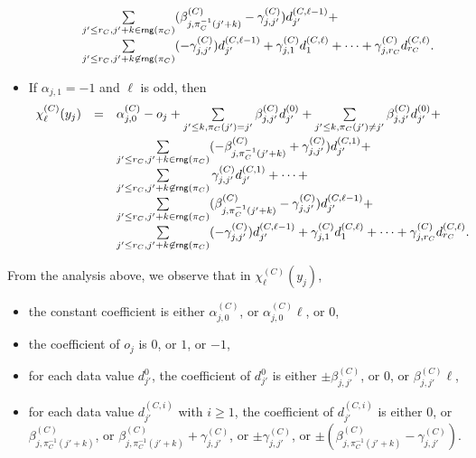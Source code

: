 \documentclass[runningheads,a4paper]{llncs}
\newcommand\rng{\mathsf{rng}}
\begin{document}
\begin{itemize}
\[\begin{array}{l c l}
%
& & \sum \limits_{j' \le r_C, j'+k \in \rng(\pi_C)} (\beta^{(C)}_{j, \pi_C^{-1}(j'+k)}-\gamma^{(C)}_{j,j'}) d^{(C,\ell-1)}_{j'} + \\
%
& & \sum \limits_{j' \le r_C,  j'+k \not \in \rng(\pi_C)} (-\gamma^{(C)}_{j,j'}) d^{(C,\ell-1)}_{j'} + \gamma^{(C)}_{j, 1} d^{(C,\ell)}_{1} + \dots + \gamma^{(C)}_{j,r_C} d^{(C,\ell)}_{r_C}.
\end{array} 
\]
\item If $\alpha_{j,1}=-1$ and $\ell$ is odd, then
\[
\begin{array}{l c l}
\smallskip
\chi^{(C)}_{\ell}(y_j)  & = &  \alpha^{(C)}_{j,0} - o_j + \sum \limits_{j' \le k, \pi_C(j')=j'} \beta^{(C)}_{j,j'} d^{(0)}_{j'} +  \sum \limits_{j'\le k, \pi_C(j') \neq j'}  \beta^{(C)}_{j,j'} d^{(0)}_{j'} +  \\
%
& & \sum \limits_{j' \le r_C, j'+k \in \rng(\pi_C)} ( -\beta^{(C)}_{j, \pi_C^{-1}(j'+k)} +\gamma^{(C)}_{j,j'}) d^{(C,1)}_{j'} + \\
%
& & \sum \limits_{j' \le r_C,  j'+k \not \in \rng(\pi_C)} \gamma^{(C)}_{j,j'} d^{(C,1)}_{j'} + \dots + \\
%
& & \sum \limits_{j' \le r_C, j'+k \in \rng(\pi_C)} (\beta^{(C)}_{j, \pi_C^{-1}(j'+k)}-\gamma^{(C)}_{j,j'}) d^{(C,\ell-1)}_{j'} + \\
%
& & \sum \limits_{j' \le r_C,  j'+k \not \in \rng(\pi_C)} (-\gamma^{(C)}_{j,j'}) d^{(C,\ell-1)}_{j'} + \gamma^{(C)}_{j, 1} d^{(C,\ell)}_{1} + \dots + \gamma^{(C)}_{j,r_C} d^{(C,\ell)}_{r_C}.
\end{array} 
\]
\end{itemize}
%
From the analysis above, we observe that in $\chi^{(C)}_\ell(y_j)$, 
\begin{itemize}
\item the constant coefficient is either $\alpha^{(C)}_{j,0}$, or $\alpha^{(C)}_{j,0} \ell$, or $0$, 
%
\item the coefficient of $o_j$ is $0$, or $1$, or $-1$, 
%
\item for each data value $d^0_{j'}$, the coefficient of $d^0_{j'}$ is either $\pm \beta^{(C)}_{j,j'}$, or $0$, or $\beta^{(C)}_{j,j'} \ell$,
%
\item for each data value $d^{(C,i)}_{j'}$ with $i \ge 1$, the coefficient of $d^{(C,i)}_{j'}$ is either $0$, or $\beta^{(C)}_{j, \pi_C^{-1}(j'+k)}$, or $\beta^{(C)}_{j, \pi_C^{-1}(j'+k)}+\gamma^{(C)}_{j,j'}$, or $\pm \gamma^{(C)}_{j,j'}$, or $\pm(\beta^{(C)}_{j, \pi_C^{-1}(j'+k)}-\gamma^{(C)}_{j,j'})$.
\end{itemize}
\end{document}
